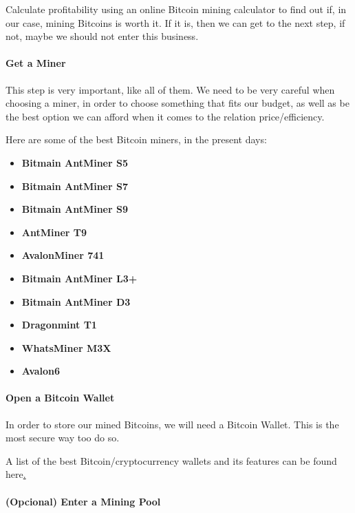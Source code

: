 \documentclass{article}
\newcommand\tab[1][1cm]{\hspace*{#1}}
\begin{document}
\tab Calculate profitability using an online Bitcoin mining calculator to find out if, in our case, mining Bitcoins is worth it. If it is, then we can get to the next step, if not, maybe we should not enter this business.

\paragraph{Get a Miner}

\tab This step is very important, like all of them. We need to be very careful when choosing a miner, in order to choose something that fits our budget, as well as be the best option we can afford when it comes to the relation price/efficiency.

Here are some of the best Bitcoin miners, in the present days:

\begin{itemize}
    \item \textbf{Bitmain AntMiner S5}
    \item \textbf{Bitmain AntMiner S7}
    \item \textbf{Bitmain AntMiner S9}
    \item \textbf{AntMiner T9}
    \item \textbf{AvalonMiner 741}
    \item \textbf{Bitmain AntMiner L3+}
    \item \textbf{Bitmain AntMiner D3}
    \item \textbf{Dragonmint T1}
    \item \textbf{WhatsMiner M3X}
    \item \textbf{Avalon6}
\end{itemize}

\paragraph{Open a Bitcoin Wallet}

\tab In order to store our mined Bitcoins, we will need a Bitcoin Wallet. This is the most secure way too do so.

A list of the best Bitcoin/cryptocurrency wallets and its features can be found here\hyperlink{https://www.guru99.com/best-bitcoin-cryptocurrency-wallets.html}.

\paragraph{(Opcional) Enter a Mining Pool}
\end{document}
